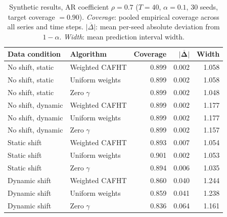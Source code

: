 \begin{table}[ht]
\centering
\small
\setlength{\tabcolsep}{8pt}
\renewcommand{\arraystretch}{1.15}
\caption{%
  Synthetic results, AR coefficient $\rho=0.7$ ($T=40$, $\alpha=0.1$, 30 seeds, target coverage $= 0.90$). \textit{Coverage}: pooled empirical coverage across all series and time steps. $\overline{|\Delta|}$: mean per-seed absolute deviation from $1-\alpha$. \textit{Width}: mean prediction interval width.
}
\label{tab:synthetic_ar07}
\begin{tabular}{@{} llrrr @{}}
\toprule
{\bfseries Data condition} & {\bfseries Algorithm}  & {\bfseries Coverage} & $\boldsymbol{\overline{|\Delta|}}$ & {\bfseries Width} \\
\midrule
No shift, static
  & Weighted CAFHT     & 0.899 & 0.002 & 1.058 \\
No shift, static
  & Uniform weights    & 0.899 & 0.002 & 1.058 \\
No shift, static
  & Zero $\gamma$      & 0.899 & 0.002 & 1.048 \\
\midrule
No shift, dynamic
  & Weighted CAFHT     & 0.899 & 0.002 & 1.177 \\
No shift, dynamic
  & Uniform weights    & 0.899 & 0.002 & 1.177 \\
No shift, dynamic
  & Zero $\gamma$      & 0.899 & 0.002 & 1.157 \\
\midrule
Static shift
  & Weighted CAFHT     & 0.893 & 0.007 & 1.054 \\
Static shift
  & Uniform weights    & 0.901 & 0.002 & 1.053 \\
Static shift
  & Zero $\gamma$      & 0.894 & 0.006 & 1.035 \\
\midrule
Dynamic shift
  & Weighted CAFHT     & 0.860 & 0.040 & 1.244 \\
Dynamic shift
  & Uniform weights    & 0.859 & 0.041 & 1.238 \\
Dynamic shift
  & Zero $\gamma$      & 0.836 & 0.064 & 1.161 \\
\bottomrule
\end{tabular}
\end{table}
